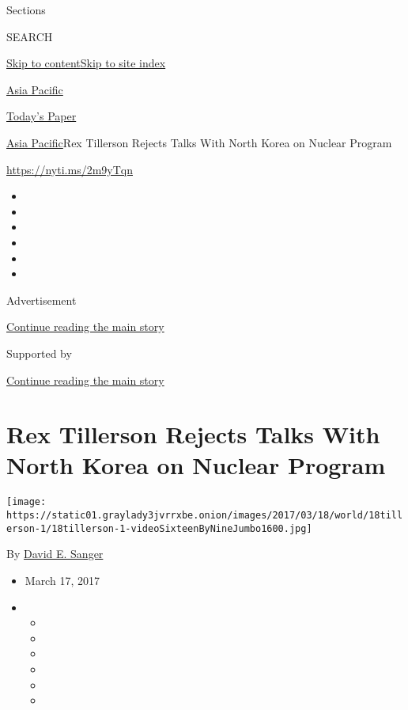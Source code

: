 Sections

SEARCH

\protect\hyperlink{site-content}{Skip to
content}\protect\hyperlink{site-index}{Skip to site index}

\href{https://www.nytimes3xbfgragh.onion/section/world/asia}{Asia
Pacific}

\href{https://myaccount.nytimes3xbfgragh.onion/auth/login?response_type=cookie\&client_id=vi}{}

\href{https://www.nytimes3xbfgragh.onion/section/todayspaper}{Today's
Paper}

\href{/section/world/asia}{Asia Pacific}\textbar{}Rex Tillerson Rejects
Talks With North Korea on Nuclear Program

\url{https://nyti.ms/2m9yTqn}

\begin{itemize}
\item
\item
\item
\item
\item
\item
\end{itemize}

Advertisement

\protect\hyperlink{after-top}{Continue reading the main story}

Supported by

\protect\hyperlink{after-sponsor}{Continue reading the main story}

\hypertarget{rex-tillerson-rejects-talks-with-north-korea-on-nuclear-program}{%
\section{Rex Tillerson Rejects Talks With North Korea on Nuclear
Program}\label{rex-tillerson-rejects-talks-with-north-korea-on-nuclear-program}}

\texttt{[image: https://static01.graylady3jvrrxbe.onion/images/2017/03/18/world/18tillerson-1/18tillerson-1-videoSixteenByNineJumbo1600.jpg]}

By \href{http://www.nytimes3xbfgragh.onion/by/david-e-sanger}{David E.
Sanger}

\begin{itemize}
\item
  March 17, 2017
\item
  \begin{itemize}
  \item
  \item
  \item
  \item
  \item
  \item
  \end{itemize}
\end{itemize}

